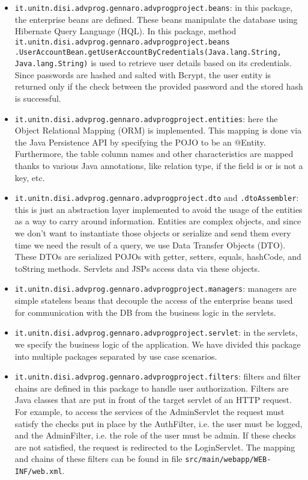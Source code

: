 \begin{itemize}
    \item \texttt{it.unitn.disi.advprog.gennaro.adv\textunderscore prog\textunderscore project.beans}: in this package, the enterprise beans are defined. These beans manipulate the database using Hibernate Query Language (HQL). In this package, method \texttt{it.unitn.disi.advprog.gennaro.adv\textunderscore prog\textunderscore project.beans}\\\texttt{.UserAccountBean.getUserAccountByCredentials(Java.lang.String, Java.lang.String)} is used to retrieve user details based on its credentials. Since passwords are hashed and salted with Bcrypt, the user entity is returned only if the check between the provided password and the stored hash is successful.
    \item \texttt{it.unitn.disi.advprog.gennaro.adv\textunderscore prog\textunderscore project.entities}: here the Object Relational Mapping (ORM) is implemented. This mapping is done via the Java Persistence API by specifying the POJO to be an @Entity. Furthermore, the table column names and other characteristics are mapped thanks to various Java annotations, like relation type, if the field is or is not a key, etc.
    \item \texttt{it.unitn.disi.advprog.gennaro.adv\textunderscore prog\textunderscore project.dto} and \texttt{.dtoAssembler}: this is just an abstraction layer implemented to avoid the usage of the entities as a way to carry around information. Entities are complex objects, and since we don't want to instantiate those objects or serialize and send them every time we need the result of a query, we use Data Transfer Objects (DTO). These DTOs are serialized POJOs with getter, setters, equals, hashCode, and toString methods. Servlets and JSPs access data via these objects.
    \item \texttt{it.unitn.disi.advprog.gennaro.adv\textunderscore prog\textunderscore project.managers}: managers are simple stateless beans that decouple the access of the enterprise beans used for communication with the DB from the business logic in the servlets.
    \item \texttt{it.unitn.disi.advprog.gennaro.adv\textunderscore prog\textunderscore project.servlet}: in the servlets, we specify the business logic of the application. We have divided this package into multiple packages separated by use case scenarios.
    \item \texttt{it.unitn.disi.advprog.gennaro.adv\textunderscore prog\textunderscore project.filters}: filters and filter chains are defined in this package to handle user authorization. Filters are Java classes that are put in front of the target servlet of an HTTP request. For example, to access the services of the AdminServlet the request must satisfy the checks put in place by the AuthFilter, i.e. the user must be logged, and the AdminFilter, i.e. the role of the user must be admin. If these checks are not satisfied, the request is redirected to the LoginServlet. The mapping and chains of these filters can be found in file \texttt{src/main/webapp/WEB-INF/web.xml}.

\end{itemize}
